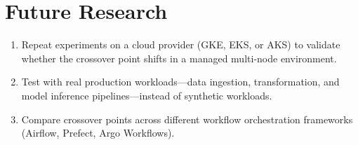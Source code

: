 
\section{Future Research}
\label{sec:future-research}

\begin{enumerate}
  \item Repeat experiments on a cloud provider (GKE, EKS, or AKS) to validate whether the crossover point shifts in a managed multi-node environment.
  \item Test with real production workloads---data ingestion, transformation, and model inference pipelines---instead of synthetic workloads.
  \item Compare crossover points across different workflow orchestration frameworks (Airflow, Prefect, Argo Workflows).
\end{enumerate}

